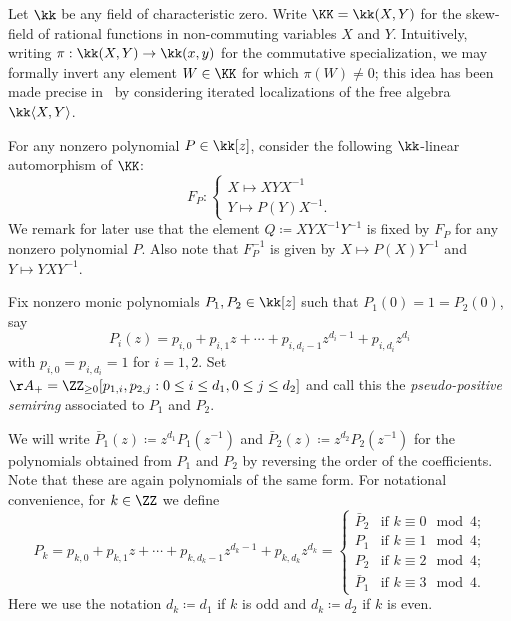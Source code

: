  \noindent
 Let $\kk$ be any field of characteristic zero. Write $\KK=\kk(X,Y)$ for the skew-field of rational functions in non-commuting variables $X$ and $Y$. Intuitively, writing $\pi:\kk(X,Y)\to\kk(x,y)$ for the commutative specialization, we may formally invert any element $W\in\KK$ for which $\pi(W)\ne0$; this idea has been made precise in~\cite{usnich1} by considering iterated localizations of the free algebra $\kk\langle X,Y\rangle$.

 For any nonzero polynomial $P\in\kk[z]$, consider the following $\kk$-linear automorphism of $\KK$:
 \[F_P:\begin{cases} X\mapsto XYX^{-1}\\ Y\mapsto P(Y)X^{-1}.\end{cases}\]
 We remark for later use that the element $Q\coloneqq XYX^{-1}Y^{-1}$ is fixed by $F_P$ for any nonzero polynomial $P$.
 Also note that $F_P^{-1}$ is given by $X\mapsto P(X)Y^{-1}$ and $Y\mapsto YXY^{-1}$.

 Fix nonzero monic polynomials $P_1,P_2\in\kk[z]$ such that $P_1(0)=1=P_2(0)$, say
 \[P_i(z)=p_{i,0}+p_{i,1}z+\cdots+p_{i,d_i-1}z^{d_i-1}+p_{i,d_i}z^{d_i}\]
 with $p_{i,0}=p_{i,d_i}=1$ for $i=1,2$. Set $\AA_+=\ZZ_{\ge0}[p_{1,i},p_{2,j}:0\le i\le d_1,0\le j\le d_2]$ and call this the \emph{pseudo-positive semiring} associated to $P_1$ and $P_2$. 

 We will write $\bar{P}_1(z)\coloneqq z^{d_1}P_1(z^{-1})$ and $\bar{P}_2(z)\coloneqq z^{d_2}P_2(z^{-1})$ for the polynomials obtained from $P_1$ and $P_2$ by reversing the order of the coefficients. Note that these are again polynomials of the same form. For notational convenience, for $k\in\ZZ$ we define 
 \begin{equation}
 \label{eq:reversed polynomials}
 P_k=p_{k,0}+p_{k,1}z+\cdots+p_{k,d_k-1}z^{d_k-1}+p_{k,d_k}z^{d_k}=\begin{cases}\bar{P}_2 & \text{if $k\equiv 0\mod 4$;}\\P_1 & \text{if $k\equiv 1\mod 4$;}\\P_2 & \text{if $k\equiv 2\mod 4$;}\\\bar{P}_1 & \text{if $k\equiv 3\mod 4$.}\end{cases}
 \end{equation}
 Here we use the notation $d_k\coloneqq d_1$ if $k$ is odd and $d_k\coloneqq d_2$ if $k$ is even.

